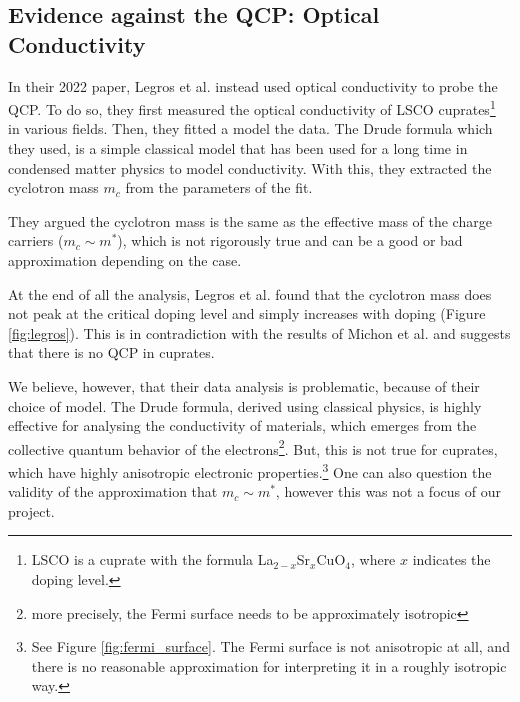 \subsection{Evidence against the QCP: Optical Conductivity}
In their 2022 paper, Legros et al.\cite{legros2022} instead used optical conductivity to
probe the QCP. To do so, they first measured the optical conductivity of LSCO cuprates\footnote{
LSCO is a cuprate with the formula La$_{2-x}$Sr$_x$CuO$_4$, where $x$ indicates the doping level.} in various fields. 
Then, they fitted a model the data. 
The Drude formula which they used, is a simple classical model that has been used for a long time in condensed matter physics to model conductivity. 
With this, they extracted the cyclotron mass $m_c$ from the parameters of the fit.

They argued the cyclotron mass is the same as the effective mass of the charge carriers
($m_c \sim m^*$), which is not rigorously true and can be a good or bad approximation depending on the case.

At the end of all the analysis, Legros et al.\cite{legros2022} found that the cyclotron mass does not peak
at the critical doping level and simply increases with doping (Figure \ref{fig:legros}). This is in contradiction with the
results of Michon et al. and suggests that there is no QCP in cuprates.

We believe, however, that their data analysis is problematic, because of their choice of model. 
The Drude formula, derived using classical physics, is highly effective for
analysing the conductivity of materials, which emerges from the collective quantum behavior of the
electrons\footnote{more precisely, the Fermi surface needs to be approximately isotropic}. 
But, this is not true for cuprates, 
which have highly anisotropic electronic properties.\footnote{See Figure
\ref{fig:fermi_surface}. The Fermi surface is not anisotropic at all, and there is no reasonable
approximation for interpreting it in a roughly isotropic way.} 
One can also question the validity of the approximation that $m_c \sim m^*$, 
however this was not a focus of our project.
